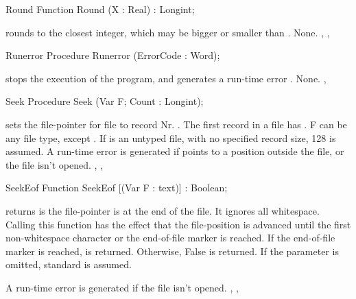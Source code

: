\documentclass{report}
\begin{document}
\html{}
\begin{function}{Round}
\Declaration
Function Round (X : Real) : Longint;

\Description
{} rounds  to the closest integer, which may be bigger or
smaller than .
\Errors
None.
\SeeAlso
{}, , 
\end{function}
\html{}
\begin{procedure}{Runerror}
\Declaration
Procedure Runerror (ErrorCode : Word);

\Description
{} stops the execution of the program, and generates a
run-time error .
\Errors
None.
\SeeAlso
{}, 
\end{procedure}
\html{}
\begin{procedure}{Seek}
\Declaration
Procedure Seek (Var F; Count : Longint);

\Description
{} sets the file-pointer for file  to record Nr. .
The first record in a file has . F can be any file type, except
. If  is an untyped file, with no specified record size, 128
is assumed.
\Errors
A run-time error is generated if  points to a position outside
the file, or the file isn't opened.
\SeeAlso
{}, , 
\end{procedure}
\html{}
\begin{function}{SeekEof}
\Declaration
Function SeekEof [(Var F : text)] : Boolean;

\Description
{} returns  is the file-pointer is at the end of the
file. It ignores all whitespace.
Calling this function has the effect that the file-position is advanced
until the first non-whitespace character or the end-of-file marker is
reached.
If the end-of-file marker is reached,  is returned. Otherwise,
False is returned.
If the parameter  is omitted, standard  is assumed.

\Errors
A run-time error is generated if the file  isn't opened.
\SeeAlso
{}, , 
\end{function}
\html{}
\end{document}
